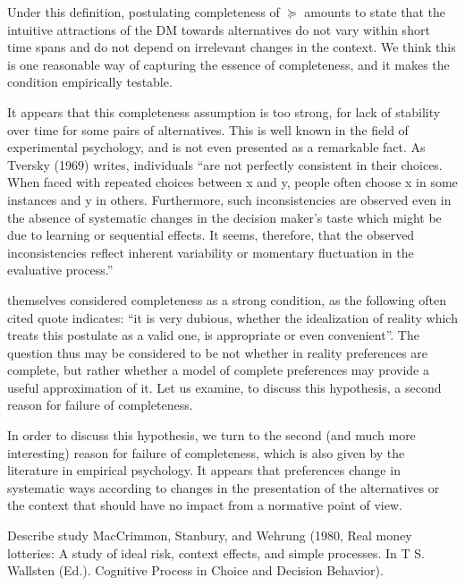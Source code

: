 \documentclass[french, english]{llncs}
\begin{document}
	Under this definition, postulating completeness of $\succeq$ amounts to state that the intuitive attractions of the \ac{DM} towards alternatives do not vary within short time spans and do not depend on irrelevant changes in the context. We think this is one reasonable way of capturing the essence of completeness, and it makes the condition empirically testable.
	
	It appears that this completeness assumption is too strong, for lack of stability over time for some pairs of alternatives. This is well known in the field of experimental psychology, and is not even presented as a remarkable fact. As Tversky (1969) writes, individuals “are not perfectly consistent in their choices. When faced with repeated choices between x and y, people often choose x in some instances and y in others. Furthermore, such inconsistencies are observed even in the absence of systematic changes in the decision maker’s taste which might be due to learning or sequential effects. It seems, therefore, that the observed inconsistencies reflect inherent variability or momentary fluctuation in the evaluative process.” 
	
	\citet[p. 630]{vNM} themselves considered completeness as a strong condition, as the following often cited quote indicates: “it is very dubious, whether the idealization of reality which treats this postulate as a valid one, is appropriate or even convenient”.
	The question thus may be considered to be not whether in reality preferences are complete, but rather whether a model of complete preferences may provide a useful approximation of it. Let us examine, to discuss this hypothesis, a second reason for failure of completeness.
	
	In order to discuss this hypothesis, we turn to the second (and much more interesting) reason for failure of completeness, which is also given by the literature in empirical psychology. It appears that preferences change in systematic ways according to changes in the presentation of the alternatives or the context that should have no impact from a normative point of view.
	
	
	Describe study MacCrimmon, Stanbury, and Wehrung (1980, Real money lotteries: A study of ideal risk, context effects, and simple processes. In T S. Wallsten (Ed.). Cognitive Process in Choice and Decision Behavior).
	
\end{document}
